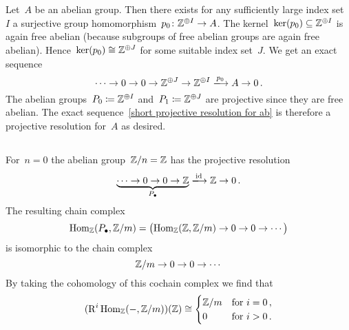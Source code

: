 \section{}





\subsection{}

Let~$A$ be an abelian group.
Then there exists for any sufficiently large index set~$I$ a surjective group homomorphism~$p_0 \colon \mathbb{Z}^{\oplus I} \to A$.
The kernel~$\ker(p_0) \subseteq \mathbb{Z}^{\oplus I}$ is again free abelian (because subgroups of free abelian groups are again free abelian).
Hence~$\ker(p_0) \cong \mathbb{Z}^{\oplus J}$ for some suitable index set~$J$.
We get an exact sequence
\begin{equation}
  \label{short projective resolution for ab}
  \dotsb
  \to
  0
  \to
  0
  \to
  \Integer^{\oplus J}
  \to
  \Integer^{\oplus I}
  \xlongto{p_0}
  A
  \to
  0 \,.
\end{equation}
The abelian groups~$P_0 \coloneqq \mathbb{Z}^{\oplus I}$ and~$P_1 \coloneqq \mathbb{Z}^{\oplus J}$ are projective since they are free abelian.
The exact sequence~\eqref{short projective resolution for ab} is therefore a projective resolution for~$A$ as desired.





\subsection{}

For~$n = 0$ the abelian group~$\mathbb{Z}/n = \mathbb{Z}$ has the projective resolution
\[
  \underbrace{
  \dotsb
  \to
  0
  \to
  0
  \to
  \Integer
  }_{\Pcc}
  \xlongto{\id}
  \Integer
  \to
  0 \,.
\]
The resulting chain complex
\[
  \operatorname{Hom}_{\mathbb{Z}}(P_\bullet, \mathbb{Z}/m)
  =
  \bigl(
    \operatorname{Hom}_{\mathbb{Z}}(\mathbb{Z},\mathbb{Z}/m)
    \to
    0
    \to
    0
    \to
    \dotsb
  \bigr)
\]
is isomorphic to the chain complex
\[
  \mathbb{Z}/m
  \to
  0
  \to
  0
  \to
  \dotsb
\]
By taking the cohomology of this cochain complex we find that
\[
  ( \operatorname{R}^i \operatorname{Hom}_{\mathbb{Z}}(-,\mathbb{Z}/m) )(\mathbb{Z})
  \cong
  \begin{cases}
    \mathbb{Z}/m  & \text{for~$i = 0$}  \,, \\
    0           & \text{for~$i > 0$}  \,.
  \end{cases}
\]


